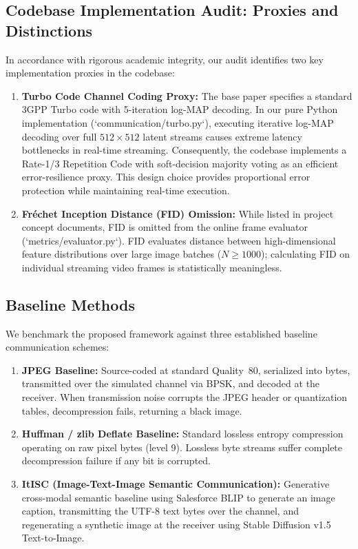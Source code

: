 \documentclass[journal,twocolumn]{IEEEtran}
\begin{document}
\subsection{Codebase Implementation Audit: Proxies and Distinctions}
In accordance with rigorous academic integrity, our audit identifies two key implementation proxies in the codebase:
\begin{enumerate}
    \item \textbf{Turbo Code Channel Coding Proxy:} The base paper specifies a standard 3GPP Turbo code with 5-iteration log-MAP decoding. In our pure Python implementation (`communication/turbo.py`), executing iterative log-MAP decoding over full $512\times 512$ latent streams causes extreme latency bottlenecks in real-time streaming. Consequently, the codebase implements a Rate-1/3 Repetition Code with soft-decision majority voting as an efficient error-resilience proxy. This design choice provides proportional error protection while maintaining real-time execution.
    \item \textbf{Fréchet Inception Distance (FID) Omission:} While listed in project concept documents, FID is omitted from the online frame evaluator (`metrics/evaluator.py`). FID evaluates distance between high-dimensional feature distributions over large image batches ($N \ge 1000$); calculating FID on individual streaming video frames is statistically meaningless.
\end{enumerate}

\subsection{Baseline Methods}
We benchmark the proposed framework against three established baseline communication schemes:
\begin{enumerate}
    \item \textbf{JPEG Baseline:} Source-coded at standard Quality~80, serialized into bytes, transmitted over the simulated channel via BPSK, and decoded at the receiver. When transmission noise corrupts the JPEG header or quantization tables, decompression fails, returning a black image.
    \item \textbf{Huffman / zlib Deflate Baseline:} Standard lossless entropy compression operating on raw pixel bytes (level 9). Lossless byte streams suffer complete decompression failure if any bit is corrupted.
    \item \textbf{ItISC (Image-Text-Image Semantic Communication):} Generative cross-modal semantic baseline using Salesforce BLIP to generate an image caption, transmitting the UTF-8 text bytes over the channel, and regenerating a synthetic image at the receiver using Stable Diffusion v1.5 Text-to-Image.
\end{enumerate}
\end{document}
